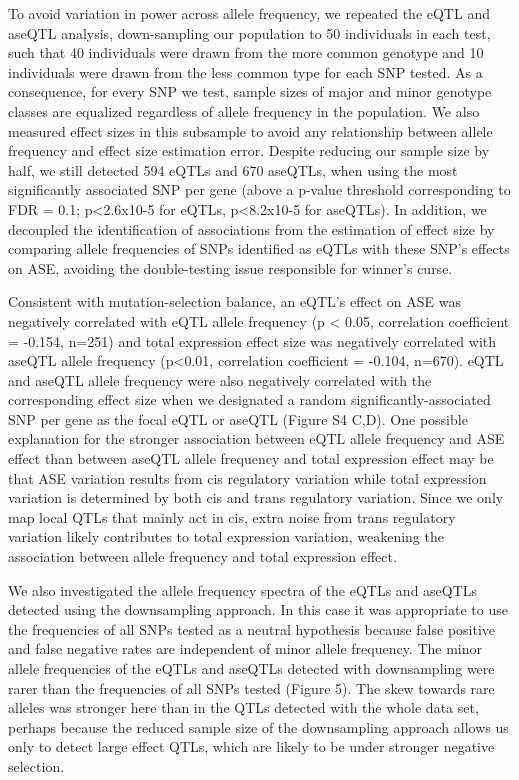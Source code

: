 To avoid variation in power across allele frequency, we repeated the eQTL and aseQTL analysis, down-sampling our population to 50 individuals in each test, such that 40 individuals were drawn from the more common genotype and 10 individuals were drawn from the less common type for each SNP tested. As a consequence, for every SNP we test, sample sizes of major and minor genotype classes are equalized regardless of allele frequency in the population. We also measured effect sizes in this subsample to avoid any relationship between allele frequency and effect size estimation error. Despite reducing our sample size by half, we still detected 594 eQTLs and 670 aseQTLs, when using the most significantly associated SNP per gene (above a p-value threshold corresponding to FDR = 0.1; p<2.6x10-5 for eQTLs, p<8.2x10-5 for aseQTLs). In addition, we decoupled the identification of associations from the estimation of effect size by comparing allele frequencies of SNPs identified as eQTLs with these SNP’s effects on ASE, avoiding the double-testing issue responsible for winner’s curse.

Consistent with mutation-selection balance, an eQTL’s effect on ASE was negatively correlated with eQTL allele frequency (p < 0.05, correlation coefficient = -0.154, n=251) and total expression effect size was negatively correlated with aseQTL allele frequency (p<0.01, correlation coefficient = -0.104, n=670). eQTL and aseQTL allele frequency were also negatively correlated with the corresponding effect size when we designated a random significantly-associated SNP per gene as the focal eQTL or aseQTL (Figure S4 C,D). One possible explanation for the stronger association between eQTL allele frequency and ASE effect than between aseQTL allele frequency and total expression effect may be that ASE variation results from cis regulatory variation while total expression variation is determined by both cis and trans regulatory variation. Since we only map local QTLs that mainly act in cis, extra noise from trans regulatory variation likely contributes to total expression variation, weakening the association between allele frequency and total expression effect.

We also investigated the allele frequency spectra of the eQTLs and aseQTLs detected using the downsampling approach. In this case it was appropriate to use the frequencies of all SNPs tested as a neutral hypothesis because false positive and false negative rates are independent of minor allele frequency. The minor allele frequencies of the eQTLs and aseQTLs detected with downsampling were rarer than the frequencies of all SNPs tested (Figure 5). The skew towards rare alleles was stronger here than in the QTLs detected with the whole data set, perhaps because the reduced sample size of the downsampling approach allows us only to detect large effect QTLs, which are likely to be under stronger negative selection. 

